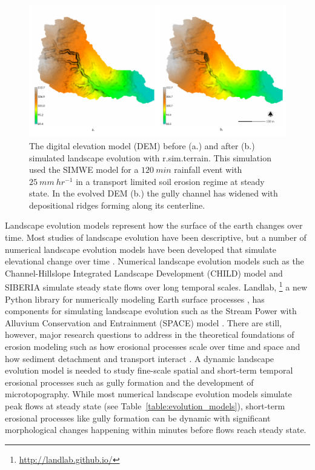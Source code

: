 \documentclass[esurf, manuscript]{copernicus}
\begin{document}

\begin{figure}%
\center
\includegraphics[width=\textwidth,height=0.925\textheight,keepaspectratio]{figures/evolution.pdf}
\caption{
The digital elevation model (DEM) 
before (a.) and after (b.)
simulated landscape evolution with
\lowercase{r.sim.terrain}. 
This simulation used the SIMWE model
for a $120~min$ rainfall event with $25~mm~hr^{-1}$
in a transport limited soil erosion regime at steady state.
In the evolved DEM (b.)
the gully channel has widened 
with depositional ridges forming along its centerline.}
\label{fig:evolution}
\end{figure}


\introduction  %
Landscape evolution models represent how the surface of the earth changes over time. 
Most studies of landscape evolution have been descriptive, 
but a number of numerical landscape evolution models 
have been developed that simulate elevational change over time 
\citep{Temme2013}. 
Numerical landscape evolution models
such as the Channel-Hillslope Integrated Landscape Development (CHILD) model 
\citep{Tucker2001} 
and SIBERIA \citep{Willgoose2005}
simulate steady state flows over long temporal scales. 
Landlab,
\footnote{\url{http://landlab.github.io/}}
a new Python library for numerically modeling Earth surface processes
\citep{Hobley2017},
has components for simulating landscape evolution such as the 
Stream Power with Alluvium Conservation and Entrainment (SPACE) 
model \citep{Shobe2017}.
There are still, however, major research questions 
to address in the theoretical foundations of erosion modeling 
such as how erosional processes scale over time and space 
and how sediment detachment and transport interact \citep{Mitasova2013}. 
A dynamic landscape evolution model is needed to study
fine-scale spatial and short-term temporal erosional processes
such as gully formation and the development of microtopography. 
While most numerical landscape evolution models 
simulate peak flows at steady state
(see Table~\ref{table:evolution_models}),
short-term erosional processes like gully formation can be dynamic
with significant morphological changes happening within minutes
before flows reach steady state. 
\end{document}
